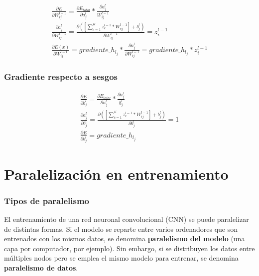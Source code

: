 \begin{gather}
	\frac{\partial E}{\partial W^{l-1}_{ij}} = \frac{\partial E_{total} }{\partial a^l_j } * \frac{\partial a^l_j}{W^{l-1}_{ij}} \\
	\frac{\partial a^l_j }{\partial W^{l-1}_{ij} } = \frac{\partial ([\sum_{c=1}^{K} z^{l-1}_c * W^{l-1}_{cj}] + b^l_j)}{\partial W^{l-1}_{ij} } = z^{l-1}_i \\
	\frac{\partial E(x) }{\partial W^{l-1}_{ij} } = gradiente\_h_{l_j} * \frac{\partial a^l_j }{\partial W^{l-1}_{ij} } = gradiente\_h_{l_j} * z^{l-1}_i 
\end{gather}

\subsubsection{Gradiente respecto a sesgos}

\begin{gather}
	\frac{\partial E}{\partial b^l_j} = \frac{\partial E_{total} }{\partial a^l_j } * \frac{\partial a^l_j}{b^l_j} \\
	\frac{\partial a^l_j }{\partial b^l_j } = \frac{\partial ([\sum_{c=1}^{K} z^{l-1}_c * W^{l-1}_{ij}] + b^l_j) }{\partial b^l_j } = 1 \\
	\frac{\partial E}{\partial b^l_j} = gradiente\_h_{l_j}
\end{gather}

\section{Paralelización en entrenamiento}

\subsubsection{Tipos de paralelismo}

El entrenamiento de una red neuronal convolucional (CNN) se puede paralelizar de distintas formas. Si el modelo se reparte entre varios ordenadores que son entrenados con los mismos datos, se denomina \textbf{paralelismo del modelo} (una capa por computador, por ejemplo). Sin embargo, si se distribuyen los datos entre múltiples nodos pero se emplea el mismo modelo para entrenar, se denomina \textbf{paralelismo de datos}. \\

